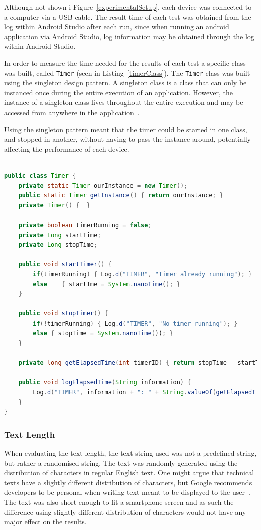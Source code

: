 Although not shown i Figure~\ref{experimentalSetup}, each device was connected to a computer via a USB cable. The result time of each test was obtained from the log within Android Studio after each run, since when running an android application via Android Studio, log information may be obtained through the log within Android Studio.

In order to measure the time needed for the results of each test a specific class was built, called \texttt{Timer} (seen in Listing~\ref{timerClass}). The \texttt{Timer} class was built using the singleton design pattern. A singleton class is a class that can only be instanced once during the entire execution of an application. However, the instance of a singleton class lives throughout the entire execution and may be accessed from anywhere in the application~\cite{singleton}.

Using the singleton pattern meant that the timer could be started in one class, and stopped in another, without having to pass the instance around, potentially affecting the performance of each device.
\newpage
\begin{lstlisting}[language=Java, caption={The Timer class}, label=timerClass]

public class Timer {
	private static Timer ourInstance = new Timer();
	public static Timer getInstance() { return ourInstance; }
	private Timer() {  }
	
	private boolean timerRunning = false;
	private Long startTime;
	private Long stopTime;
	
	public void startTimer() { 
		if(timerRunning) { Log.d("TIMER", "Timer already running"); }
		else 	{ startIme = System.nanoTime(); }
	}
	
	public void stopTimer() {
		if(!timerRunning) { Log.d("TIMER", "No timer running"); }
		else { stopTime = System.nanoTime()); }
	}
	
	private long getElapsedTime(int timerID) { return stopTime - startTime; }
	
	public void logElapsedTime(String information) {
		Log.d("TIMER", information + ": " + String.valueOf(getElapsedTime() + " nano seconds");
	}
}
\end{lstlisting}

\subsubsection{Text Length}
When evaluating the text length, the text string used was not a predefined string, but rather a randomised string. The text was randomly generated using the distribution of characters in regular English text. One might argue that technical texts have a slightly different distribution of characters, but Google recommends developers to be personal when writing text meant to be displayed to the user~\cite{glassDesignStyle}. The text was also short enough to fit a smartphone screen and as such the difference using slightly different distribution of characters would not have any major effect on the results.

